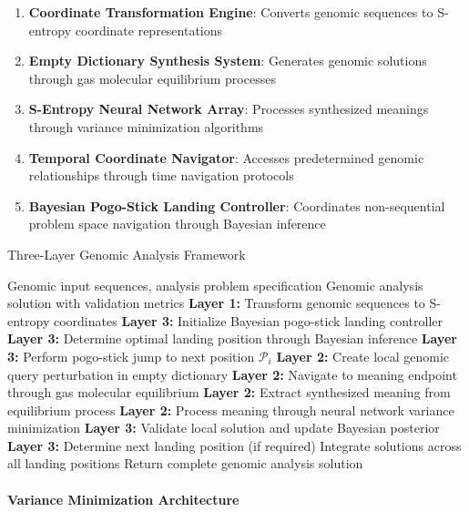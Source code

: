 \documentclass[12pt,a4paper]{article}
\begin{document}
\begin{enumerate}
\item \textbf{Coordinate Transformation Engine}: Converts genomic sequences to S-entropy coordinate representations
\item \textbf{Empty Dictionary Synthesis System}: Generates genomic solutions through gas molecular equilibrium processes  
\item \textbf{S-Entropy Neural Network Array}: Processes synthesized meanings through variance minimization algorithms
\item \textbf{Temporal Coordinate Navigator}: Accesses predetermined genomic relationships through time navigation protocols
\item \textbf{Bayesian Pogo-Stick Landing Controller}: Coordinates non-sequential problem space navigation through Bayesian inference
\end{enumerate}

\begin{algorithm}[H]
\caption{Three-Layer Genomic Analysis Framework}
\begin{algorithmic}[1]
\REQUIRE Genomic input sequences, analysis problem specification
\ENSURE Genomic analysis solution with validation metrics
\STATE \textbf{Layer 1:} Transform genomic sequences to S-entropy coordinates
\STATE \textbf{Layer 3:} Initialize Bayesian pogo-stick landing controller
\STATE \textbf{Layer 3:} Determine optimal landing position through Bayesian inference
    \STATE \textbf{Layer 3:} Perform pogo-stick jump to next position $\mathcal{P}_i$
    \STATE \textbf{Layer 2:} Create local genomic query perturbation in empty dictionary
    \STATE \textbf{Layer 2:} Navigate to meaning endpoint through gas molecular equilibrium
    \STATE \textbf{Layer 2:} Extract synthesized meaning from equilibrium process  
    \STATE \textbf{Layer 2:} Process meaning through neural network variance minimization
    \STATE \textbf{Layer 3:} Validate local solution and update Bayesian posterior
    \STATE \textbf{Layer 3:} Determine next landing position (if required)
\ENDWHILE
\STATE Integrate solutions across all landing positions
\STATE Return complete genomic analysis solution
\end{algorithmic}
\end{algorithm}

\paragraph{Variance Minimization Architecture}
\end{document}
